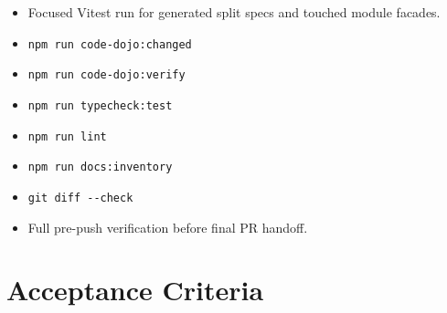 \begin{itemize}
\tightlist
\item
  Focused Vitest run for generated split specs and touched module facades.
\item
  \texttt{n\allowbreak{}p\allowbreak{}m\allowbreak{} \allowbreak{}r\allowbreak{}u\allowbreak{}n\allowbreak{} \allowbreak{}c\allowbreak{}o\allowbreak{}d\allowbreak{}e\allowbreak{}-\allowbreak{}d\allowbreak{}o\allowbreak{}j\allowbreak{}o\allowbreak{}:\allowbreak{}c\allowbreak{}h\allowbreak{}a\allowbreak{}n\allowbreak{}g\allowbreak{}e\allowbreak{}d}
\item
  \texttt{n\allowbreak{}p\allowbreak{}m\allowbreak{} \allowbreak{}r\allowbreak{}u\allowbreak{}n\allowbreak{} \allowbreak{}c\allowbreak{}o\allowbreak{}d\allowbreak{}e\allowbreak{}-\allowbreak{}d\allowbreak{}o\allowbreak{}j\allowbreak{}o\allowbreak{}:\allowbreak{}v\allowbreak{}e\allowbreak{}r\allowbreak{}i\allowbreak{}f\allowbreak{}y}
\item
  \texttt{n\allowbreak{}p\allowbreak{}m\allowbreak{} \allowbreak{}r\allowbreak{}u\allowbreak{}n\allowbreak{} \allowbreak{}t\allowbreak{}y\allowbreak{}p\allowbreak{}e\allowbreak{}c\allowbreak{}h\allowbreak{}e\allowbreak{}c\allowbreak{}k\allowbreak{}:\allowbreak{}t\allowbreak{}e\allowbreak{}s\allowbreak{}t}
\item
  \texttt{n\allowbreak{}p\allowbreak{}m\allowbreak{} \allowbreak{}r\allowbreak{}u\allowbreak{}n\allowbreak{} \allowbreak{}l\allowbreak{}i\allowbreak{}n\allowbreak{}t}
\item
  \texttt{n\allowbreak{}p\allowbreak{}m\allowbreak{} \allowbreak{}r\allowbreak{}u\allowbreak{}n\allowbreak{} \allowbreak{}d\allowbreak{}o\allowbreak{}c\allowbreak{}s\allowbreak{}:\allowbreak{}i\allowbreak{}n\allowbreak{}v\allowbreak{}e\allowbreak{}n\allowbreak{}t\allowbreak{}o\allowbreak{}r\allowbreak{}y}
\item
  \texttt{g\allowbreak{}i\allowbreak{}t\allowbreak{} \allowbreak{}d\allowbreak{}i\allowbreak{}f\allowbreak{}f\allowbreak{} \allowbreak{}-\allowbreak{}-\allowbreak{}c\allowbreak{}h\allowbreak{}e\allowbreak{}c\allowbreak{}k}
\item
  Full pre-push verification before final PR handoff.
\end{itemize}

\section{Acceptance Criteria}\label{record-244-acceptance-criteria}

